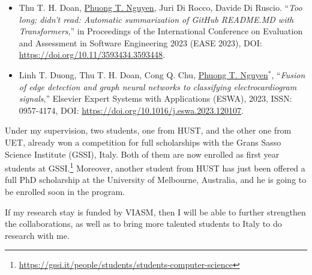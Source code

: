\begin{itemize}
	\item Thu T. H. Doan, \underline{Phuong T. Nguyen}, Juri Di Rocco, Davide Di Ruscio. ``\emph{Too long; didn’t read: Automatic summarization of GitHub
		README.MD with Transformers},'' in Proceedings of the International Conference on Evaluation and Assessment in Software Engineering 2023 (EASE 2023), DOI: \href{https://doi.org/10.1145/3593434.3593448}{https://doi.org/10.11/3593434.3593448}.
	\item 	Linh T. Duong, Thu T. H. Doan, Cong Q. Chu, \underline{Phuong T. Nguyen}$^{*}$, ``\emph{Fusion of edge detection and graph neural networks to classifying electrocardiogram signals},'' Elsevier Expert Systems with Applications (ESWA), 2023, ISSN: 0957-4174, DOI: \href{https://doi.org/10.1016/j.eswa.2023.120107}{https://doi.org/10.1016/j.eswa.2023.120107}.
\end{itemize}


Under my supervision, two students, one from HUST, and the other one from UET, already won a competition for full scholarships with the Grans Sasso Science Institute (GSSI), Italy. Both of them are now enrolled as first year students at GSSI.\footnote{\url{https://gssi.it/people/students/students-computer-science}} Moreover, another student from HUST has just been offered a full PhD scholarship at the University of Melbourne, Australia, and he is going to be enrolled soon in the program. 


If my research stay is funded by VIASM, then I will be able to further strengthen the collaborations, as well as to bring more talented students to Italy to do research with me. 

